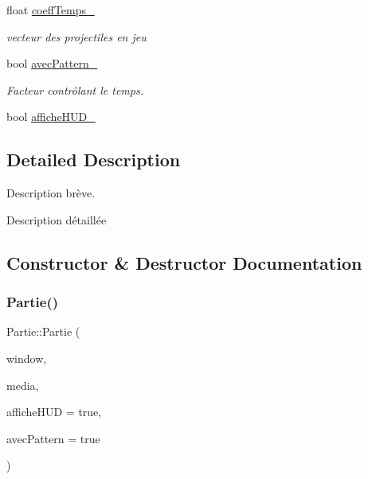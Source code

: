 \begin{DoxyCompactItemize}
float \mbox{\hyperlink{class_partie_a930930641a38c62337f4c4de60523ac3}{coeff\+Temps\+\_\+}}
\begin{DoxyCompactList}\small\item\em vecteur des projectiles en jeu \end{DoxyCompactList}\item 
bool \mbox{\hyperlink{class_partie_ac29991e8e0eb729541168f47238635a9}{avec\+Pattern\+\_\+}}
\begin{DoxyCompactList}\small\item\em Facteur contrôlant le temps. \end{DoxyCompactList}\item 
bool \mbox{\hyperlink{class_partie_a253b0099bf8ef4c3dce2fe3e3dd8def5}{affiche\+H\+U\+D\+\_\+}}
\end{DoxyCompactItemize}


\subsection{Detailed Description}
Description brève. 

Description détaillée 

\subsection{Constructor \& Destructor Documentation}
\mbox{\label{class_partie_a480ca8b79b54d01f4d1f1722f6c42935}} 
\subsubsection{\texorpdfstring{Partie()}{Partie()}}
{\footnotesize\ttfamily Partie\+::\+Partie (\begin{DoxyParamCaption}\item[{sf\+::\+Render\+Window \&}]{window,  }\item[{\mbox{\hyperlink{class_input__base_a455585e7933485981b3d7bfcad3a47c6}{Input\+::\+Media}}}]{media,  }\item[{bool}]{affiche\+H\+UD = {\ttfamily true},  }\item[{bool}]{avec\+Pattern = {\ttfamily true} }\end{DoxyParamCaption})}

\mbox{\label{class_partie_ae4afeb7336bb84427272cfb7018b5e3d}} 
